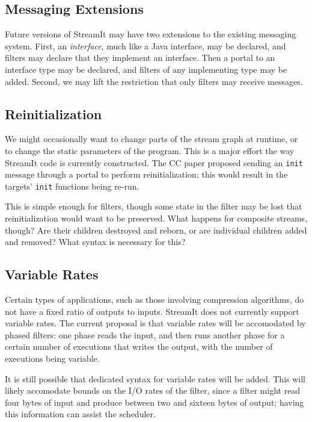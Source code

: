 \documentclass[11pt]{article}
\begin{document}
\subsection{Messaging Extensions}

Future versions of StreamIt may have two extensions to the existing
messaging system.  First, an \emph{interface}, much like a Java
interface, may be declared, and filters may declare that they
implement an interface.  Then a portal to an interface type may be
declared, and filters of any implementing type may be added.  Second,
we may lift the restriction that only filters may receive messages.

\subsection{Reinitialization}

We might occasionally want to change parts of the stream graph at
runtime, or to change the static parameters of the program.  This is a
major effort the way StreamIt code is currently constructed.  The CC
paper proposed sending an \lstinline|init| message through a portal to
perform reinitialization; this would result in the targets'
\lstinline|init| functions being re-run.

This is simple enough for filters, though some state in the filter may
be lost that reinitialization would want to be preserved.  What
happens for composite streams, though?  Are their children destroyed
and reborn, or are individual children added and removed?  What syntax
is necessary for this?

\subsection{Variable Rates}

Certain types of applications, such as those involving compression
algorithms, do not have a fixed ratio of outputs to inputs.  StreamIt
does not currently support variable rates.  The current proposal is
that variable rates will be accomodated by phased filters: one phase
reads the input, and then runs another phase for a certain number of
executions that writes the output, with the number of executions being
variable.

It is still possible that dedicated syntax for variable rates will be
added.  This will likely accomodate bounds on the I/O rates of the
filter, since a filter might read four bytes of input and produce
between two and sixteen bytes of output; having this information can
assist the scheduler.
\end{document}
